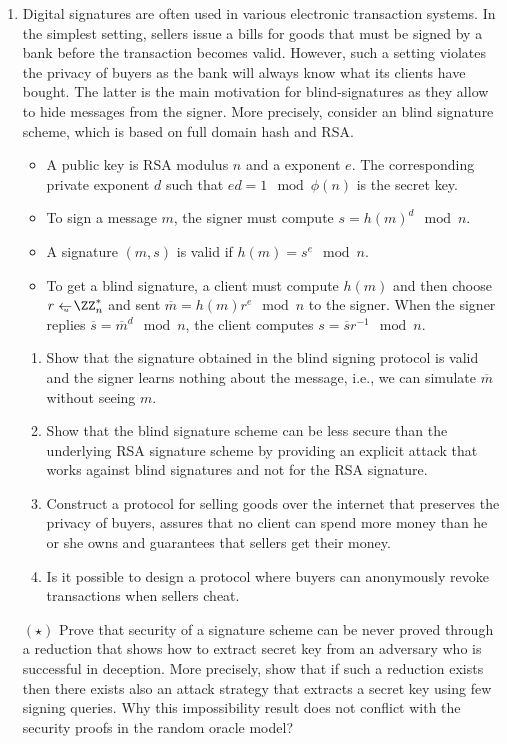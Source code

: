 \documentclass{article}
\begin{document}
\begin{enumerate}
\item Digital signatures are often used in various electronic
  transaction systems. In the simplest setting, sellers issue a bills
  for goods that must be signed by a bank before the transaction
  becomes valid. However, such a setting violates the privacy of
  buyers as the bank will always know what its clients have bought.
  The latter is the main motivation for blind-signatures as they allow
  to hide messages from the signer. More precisely, consider an blind
  signature scheme, which is based on full domain hash and RSA.
  \begin{itemize}
  \item A public key is RSA modulus $n$ and a exponent $e$. The
    corresponding private exponent $d$ such that $ed=1\mod \phi(n)$ is
    the secret key.
  \item To sign a message $m$, the signer must compute $s=h(m)^d\mod
    n$.
  \item A signature $(m,s)$ is valid if $h(m)=s^e\mod n$. 
  \item To get a blind signature, a client must compute $h(m)$ and
    then choose $r\getsu\ZZ_n^*$ and sent $\overline{m}=h(m)r^e\mod n$
    to the signer. When the signer replies
    $\overline{s}=\overline{m}^d\mod n$, the client computes
    $s=\overline{s}r^{-1}\mod n$.
  \end{itemize}
  \begin{enumerate}
  \item Show that the signature obtained in the blind signing protocol
    is valid and the signer learns nothing about the message, i.e., we
    can simulate $\overline{m}$ without seeing $m$.
  \item Show that the blind signature scheme can be less secure than
    the underlying RSA signature scheme by providing an explicit
    attack that works against blind signatures and not for the RSA
    signature.
  \item Construct a protocol for selling goods over the internet that
    preserves the privacy of buyers, assures that no client can spend
    more money than he or she owns and guarantees that sellers
    get their money.
  \item Is it possible to design a protocol where buyers can
    anonymously revoke transactions when sellers cheat.
  \end{enumerate}



\item[$(\star)$] Prove that security of a signature scheme can be
  never proved through a reduction that shows how to extract secret
  key from an adversary who is successful in deception. More
  precisely, show that if such a reduction exists then there exists
  also an attack strategy that extracts a secret key using few signing
  queries. Why this impossibility result does not conflict with the
  security proofs in the random oracle model?


\end{enumerate}
\end{document}
